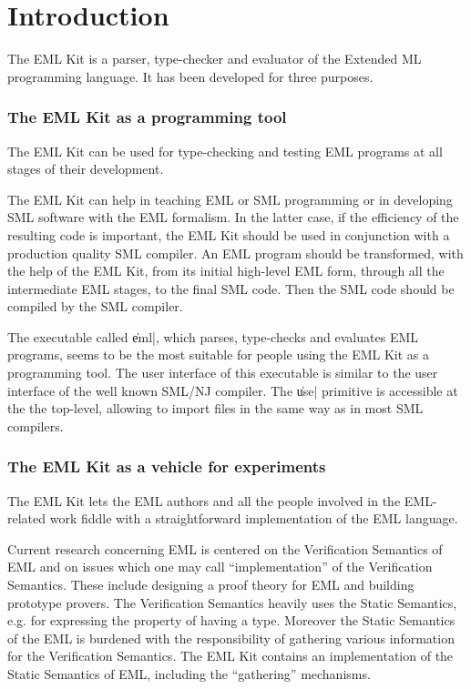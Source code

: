 \part{Introduction}
\label{sec:intro}

The EML Kit is a parser, type-checker and evaluator of
the Extended ML programming language. It has been developed for three purposes.

\section{The EML Kit as a programming tool}
\label{sec:tool}

The EML Kit can be used for type-checking and testing EML programs
at all stages of their development. 

The EML Kit can help in teaching EML or SML programming
or in developing SML software with the EML formalism. 
In the latter case, if the efficiency of the resulting
code is important, the EML Kit should be used in conjunction
with a production quality SML compiler. An EML program 
should be transformed, with the help of the EML Kit, from its 
initial high-level EML form, through all the intermediate EML stages,
to the final SML code. Then the SML code should be compiled by the SML compiler.

The executable called \|eml|, which parses, type-checks and evaluates EML programs,
seems to be the most suitable for people using the EML Kit as a programming tool. 
The user interface of this executable is similar to the user interface 
of the well known SML/NJ compiler.
The \|use| primitive is accessible at the the top-level,
allowing to import files in the same way as in most SML compilers. 

\section{The EML Kit as a vehicle for experiments}
\label{sec:vehicle}

The EML Kit lets the EML authors and all the people involved in
the EML-related work fiddle with a straightforward implementation of the EML language.

Current research concerning EML is centered on the Verification
Semantics of EML and on issues which one may call ``implementation''
of the Verification Semantics. These include designing a proof theory
for EML and building prototype provers. 
The Verification Semantics heavily uses the Static Semantics, 
e.g. for expressing the property of having a type.
Moreover the Static Semantics of the EML is burdened with
the responsibility of gathering various information for the Verification Semantics.
The EML Kit contains an implementation of the Static Semantics of EML,
including the ``gathering'' mechanisms.

